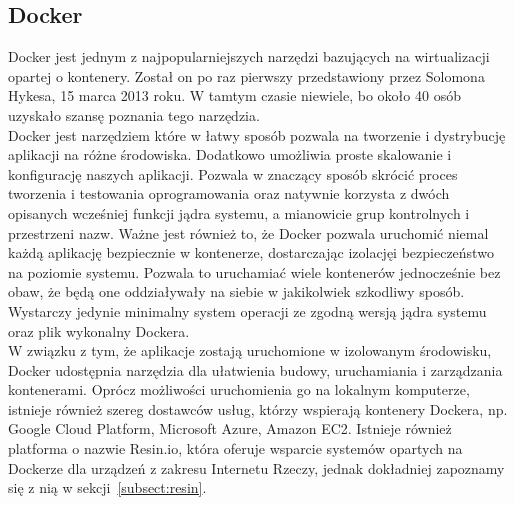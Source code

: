 \documentclass[12pt]{report}
\let\Oldsubsection\subsection
\renewcommand{\subsection}{\FloatBarrier\Oldsubsection}
\begin{document}
\subsection{Docker}
Docker jest jednym z najpopularniejszych narzędzi bazujących na wirtualizacji opartej o kontenery. Został on po raz pierwszy przedstawiony przez Solomona Hykesa, 15 marca 2013 roku. W tamtym czasie niewiele, bo około 40 osób uzyskało szansę poznania tego narzędzia. \\
\indent Docker jest narzędziem które w łatwy sposób pozwala na tworzenie i dystrybucję aplikacji na różne środowiska. Dodatkowo umożliwia proste skalowanie i konfigura\-cję naszych aplikacji. Pozwala w znaczący sposób skrócić proces tworzenia i testowania oprogramowania oraz natywnie korzysta z dwóch opisanych wcześniej funkcji jądra systemu, a mianowicie grup kontrolnych i przestrzeni nazw. Ważne jest również to, że Docker pozwala uruchomić niemal każdą aplikację bezpiecznie w kontenerze, dostarczając izolacjęi bezpieczeństwo na poziomie systemu. Pozwala to uruchamiać wiele kontenerów jednocześnie bez obaw, że będą one oddziaływały na siebie w jakikolwiek szkodliwy sposób. Wystarczy jedynie minimalny system operacji ze zgodną wersją jądra systemu oraz plik wykonalny Dockera. \\
\indent W związku z tym, że aplikacje zostają uruchomione w izolowanym środowisku, Docker udostępnia narzędzia dla ułatwienia budowy, uruchamiania i zarządzania kontenerami. Oprócz możliwości uruchomienia go na lokalnym komputerze, istnieje również szereg dostawców usług, którzy wspierają kontenery Dockera, np. Google Cloud Platform, Microsoft Azure, Amazon EC2. Istnieje również platforma o nazwie Resin.io, która oferuje wsparcie systemów opartych na Dockerze dla urządzeń z zakresu Internetu Rzeczy, jednak dokładniej zapoznamy się z nią w sekcji~\ref{subsect:resin}.
\end{document}
